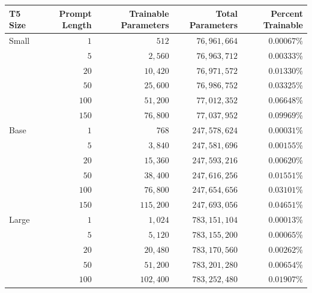 \documentclass[11pt]{article}
\begin{document}
\begin{table}[t]
    \centering
    \footnotesize
    \begin{tabular}{l r |r r r}
    \toprule
    T5 Size & Prompt Length & Trainable Parameters & Total Parameters & Percent Trainable \\
    \midrule
    Small   & $1$           & $512$                & $76{,}961{,}664$       &  $0.00067$\% \\
            & $5$           & $2{,}560$            & $76{,}963{,}712$       &  $0.00333$\% \\
            & $20$          & $10{,}420$           & $76{,}971{,}572$       &  $0.01330$\% \\
            & $50$          & $25{,}600$           & $76{,}986{,}752$       &  $0.03325$\% \\
            & $100$         & $51{,}200$           & $77{,}012{,}352$       &  $0.06648$\% \\
            & $150$         & $76{,}800$           & $77{,}037{,}952$       &  $0.09969$\% \\
    Base    & $1$           & $768$                & $247{,}578{,}624$      &  $0.00031$\% \\
            & $5$           & $3{,}840$            & $247{,}581{,}696$      &  $0.00155$\% \\
            & $20$          & $15{,}360$           & $247{,}593{,}216$      &  $0.00620$\% \\
            & $50$          & $38{,}400$           & $247{,}616{,}256$      &  $0.01551$\% \\
            & $100$         & $76{,}800$           & $247{,}654{,}656$      &  $0.03101$\% \\
            & $150$         & $115{,}200$          & $247{,}693{,}056$      &  $0.04651$\% \\
    Large   & $1$           & $1{,}024$            & $783{,}151{,}104$      &  $0.00013$\% \\
            & $5$           & $5{,}120$            & $783{,}155{,}200$      &  $0.00065$\% \\
            & $20$          & $20{,}480$           & $783{,}170{,}560$      &  $0.00262$\% \\
            & $50$          & $51{,}200$           & $783{,}201{,}280$      &  $0.00654$\% \\
            & $100$         & $102{,}400$          & $783{,}252{,}480$      &  $0.01907$\% \\

\end{tabular}
\end{table}
\end{document}
